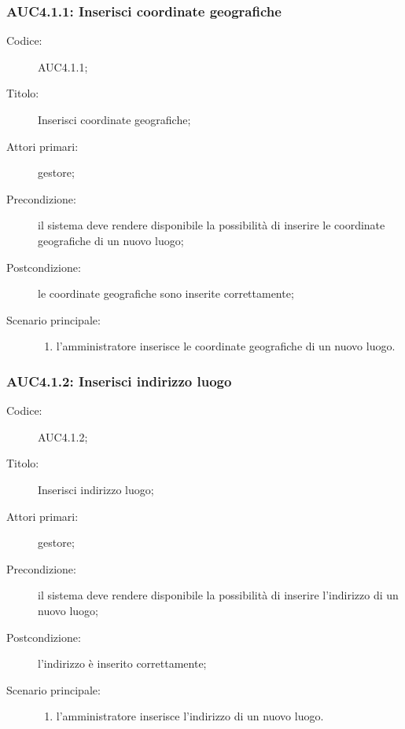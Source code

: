 \subsubsection{AUC4.1.1: Inserisci coordinate geografiche}%
\label{subs:AUC4.1.1}
\begin{description}
  \item[Codice:] AUC4.1.1;
  \item[Titolo:] Inserisci coordinate geografiche;
  \item[Attori primari:] gestore;
  \item[Precondizione:] il sistema deve rendere disponibile la possibilità di inserire le coordinate geografiche di un nuovo luogo;
  \item[Postcondizione:] le coordinate geografiche sono inserite correttamente;
  \item[Scenario principale:]
  \begin{enumerate}
    \item l'amministratore inserisce le coordinate geografiche di un nuovo luogo.
  \end{enumerate}
\end{description}

\subsubsection{AUC4.1.2: Inserisci indirizzo luogo}%
\label{subs:AUC4.1.2}
\begin{description}
  \item[Codice:] AUC4.1.2;
  \item[Titolo:] Inserisci indirizzo luogo;
  \item[Attori primari:] gestore;
  \item[Precondizione:] il sistema deve rendere disponibile la possibilità di inserire l'indirizzo di un nuovo luogo;
  \item[Postcondizione:] l'indirizzo è inserito correttamente;
  \item[Scenario principale:]
  \begin{enumerate}
    \item l'amministratore inserisce l'indirizzo di un nuovo luogo.
  \end{enumerate}
\end{description}

